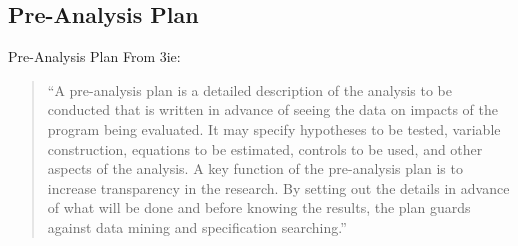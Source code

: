 \documentclass{beamer}
\begin{document}


\subsection*{Pre-Analysis Plan}
\begin{frame}{Pre-Analysis Plan}
From 3ie:
\begin{quote}
 ``A pre-analysis plan is a detailed description of the analysis to be conducted that is written in advance of seeing the data on impacts of the program being evaluated. It may specify hypotheses to be tested, variable construction, equations to be estimated, controls to be used, and other aspects of the analysis. A key function of the pre-analysis plan is to increase transparency in the research. By setting out the details in advance of what will be done and before knowing the results, the plan guards against data mining and specification searching.''
\end{quote}
\end{frame}
\end{document}
